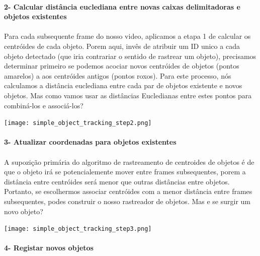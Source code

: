 \paragraph{2- Calcular distância euclediana entre novas caixas delimitadoras e objetos existentes}
\paragraph{}
Para cada subsequente frame do nosso video, aplicamos a etapa 1 de calcular os centróides de cada objeto. Porem aqui, invês de atribuir um ID unico a cada objeto detectado (que iria contrariar o sentido de rastrear um objeto), precisamos determinar primeiro se podemos acociar novos centróides de objetos (pontos amarelos) a aos centróides antigos (pontos roxos). Para este processo, nós calculamos a distância euclediana entre cada par de objetos existente e novos objetos.
\newline
Mas como vamos usar as distâncias Eucledianas entre estes pontos para combiná-los e associá-los? 

\begin{center}
  \texttt{[image: simple\_object\_tracking\_step2.png]}
  \label{img:centroid_traking2}  
\end{center}

\paragraph{3- Atualizar coordenadas para objetos existentes}
\paragraph{}
A supozição primária do algoritmo de rastreamento de centroides de objetos é de que o objeto irá se potencialemente mover entre frames subsequentes, porem a distância entre centróides será menor que outras distâncias entre objetos.
\newline
Portanto, se escolhermos associar centróides com a menor distância entre frames subsequentes, podes construir o nosso rastreador de objetos.
\newline
Mas e se surgir um novo objeto? 

\begin{center}
  \texttt{[image: simple\_object\_tracking\_step3.png]}
  \label{img:centroid_traking3}  
\end{center}


\paragraph{4- Registar novos objetos}
